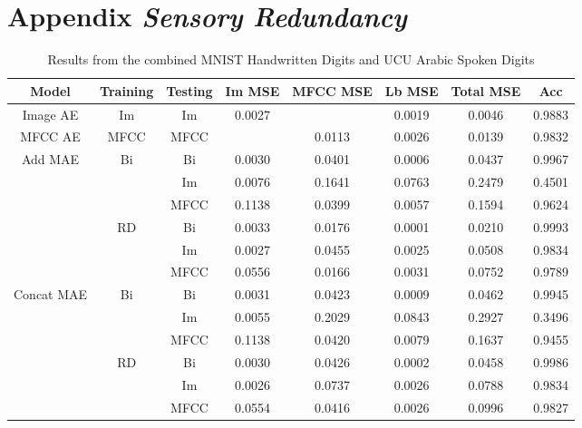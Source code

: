 \chapter{Appendix \emph{Sensory Redundancy}}
\label{appendix:app4}

\begin{landscape}
\begin{table}[p]
\centering
		\begin{tabular}{|c|c|c|c|c|c|c|c|}
		\hline
		\textbf{Model} & \textbf{Training} & \textbf{Testing} & \textbf{Im MSE} & \textbf{MFCC MSE} & \textbf{Lb MSE} & \textbf{Total MSE} & Acc \\
		\hline
		Image AE & Im & Im & 0.0027	&	&0.0019	& 0.0046	&	0.9883\\ \hline
		MFCC AE & MFCC & MFCC & 	&0.0113	&	0.0026	&	0.0139	& 0.9832\\ \hline
		\multirow{6}{*}{Add MAE} & \multirow{3}{*}{Bi} & Bi &	0.0030	&	0.0401	&	0.0006	&	0.0437	&0.9967\\ \cline{3-8}
		&& Im &	0.0076	&	0.1641	&	0.0763	&	0.2479	&0.4501 \\ \cline{3-8}
		&& MFCC &	0.1138	&	0.0399	&	0.0057	&	0.1594	&0.9624 \\ \cline{2-8}
		& \multirow{3}{*}{RD} & Bi&	0.0033	&	0.0176	&	0.0001	&	0.0210	& 0.9993 \\ \cline{3-8}
		&& Im &	0.0027	&	0.0455	&	0.0025	&	0.0508	& 0.9834\\ \cline{3-8}
		&& MFCC & 0.0556	&	0.0166	&	0.0031	&	0.0752	&	0.9789 \\ \hline
		
		\multirow{6}{*}{Concat MAE} & \multirow{3}{*}{Bi} & Bi &	0.0031	&	0.0423	&	0.0009	& 0.0462	&	0.9945 \\ \cline{3-8}
		&& Im &	0.0055	&	0.2029	&	0.0843	&	0.2927	&	0.3496 \\ \cline{3-8}
		&& MFCC &0.1138	&	0.0420	&	0.0079	&0.1637	&	0.9455 \\ \cline{2-8}
		& \multirow{3}{*}{RD} & Bi &	0.0030	&	0.0426	&	0.0002	&	0.0458	&0.9986 \\ \cline{3-8}
		&& Im &	0.0026	&	0.0737	&	0.0026	& 0.0788	&	0.9834
\\ \cline{3-8}
		&& MFCC &	0.0554	&	0.0416	&	0.0026	&	0.0996	&0.9827
 \\ \hline
		\end{tabular}
		\caption{Results from the combined MNIST Handwritten Digits and UCU Arabic Spoken Digits}
		\label{tab:mnist_ucu_master_res}
\end{table}		
\end{landscape}	

